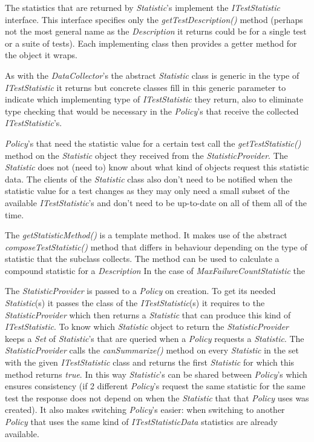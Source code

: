 \documentclass[i2]{oss}
\newcommand{\class}[1]{\emph{#1}}
\newcommand{\method}[1]{\emph{#1}}
\begin{document}
The statistics that are returned by \class{Statistic}'s implement the
\class{ITestStatistic} interface.
This interface specifies only the \method{getTestDescription()} method 
(perhaps not the most general name as the \class{Description} it returns
could be for a single test or a suite of tests).
Each implementing class then provides a getter method for the object it
wraps.

As with the \class{DataCollector}'s the abstract \class{Statistic} class
is generic in the type of \class{ITestStatistic} it returns but concrete
classes fill in this generic parameter to indicate which implementing
type of \class{ITestStatistic} they return, also to eliminate type 
checking that would be necessary in the \class{Policy}'s that receive
the collected \class{ITestStatistic}'s.

\class{Policy}'s that need the statistic value for a certain test call
the \method{getTestStatistic()} method on the \class{Statistic} object
they received from the \class{StatisticProvider}.
The \class{Statistic} does not (need to) know about what kind of objects
request this statistic data.
The clients of the \class{Statistic} class also don't need to be 
notified when the statistic value for a test changes as they may only
need a small subset of the available \class{ITestStatistic}'s and don't
need to be up-to-date on all of them all of the time.

The \method{getStatisticMethod()} is a template method.
It makes use of the abstract \method{composeTestStatistic()} method 
that differs in behaviour depending on the type of statistic that the
subclass collects.
The method can be used to calculate a compound statistic for a 
\class{Description} 
In the case of \class{MaxFailureCountStatistic} the 

The \class{StatisticProvider} is passed to a \class{Policy} on creation.
To get its needed \class{Statistic}(s) it passes the class of the 
\class{ITestStatistic}(s) it requires to the \class{StatisticProvider}
which then returns a \class{Statistic} that can produce this kind of
\class{ITestStatistic}.
To know which \class{Statistic} object to return the 
\class{StatisticProvider} keeps a \class{Set} of \class{Statistic}'s 
that are queried when a \class{Policy} requests a \class{Statistic}.
The \class{StatisticProvider} calls the \method{canSummarize()} method
on every \class{Statistic} in the set with the given 
\class{ITestStatistic} class and returns the first \class{Statistic}
for which this method returns \emph{true}.
In this way \class{Statistic}'s can be shared between \class{Policy}'s
which ensures consistency (if 2 different \class{Policy}'s request the
same statistic for the same test the response does not depend on when
the \class{Statistic} that that \class{Policy} uses was created).
It also makes switching \class{Policy}'s easier: when switching to 
another \class{Policy} that uses the same kind of 
\class{ITestStatisticData} statistics are already available.
\end{document}
